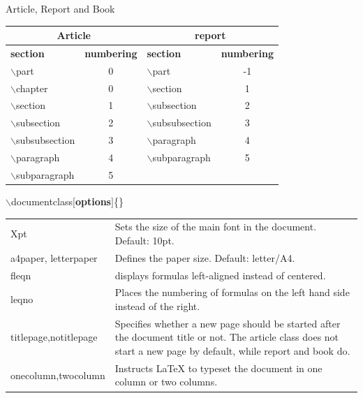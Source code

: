 \documentclass[10pt,times]{beamer}
\begin{document}
\begin{frame}{Article, Report and Book}
\begin{table}
\begin{tabular}{|l|c|l|c|}
\hline
\multicolumn{2}{c}{\textbf{Article}}  & \multicolumn{2}{c}{\textbf{report}} \\ 
\hline
\textbf{section} &\textbf{ numbering} & \textbf{section} & \textbf{numbering} \\ \hline
$\backslash$part & 0 & $\backslash$part & -1 \\ \hline
$\backslash$chapter & 0 & $\backslash$section & 1 \\ \hline
$\backslash$section & 1 & $\backslash$subsection & 2 \\ \hline
$\backslash$subsection & 2 & $\backslash$subsubsection & 3 \\ \hline
$\backslash$subsubsection & 3 & $\backslash$paragraph & 4 \\ \hline
$\backslash$paragraph & 4 & $\backslash$subparagraph & 5 \\ \hline
$\backslash$subparagraph & 5 & & \\ \hline

\end{tabular}
\end{table}
\end{frame}

\begin{frame}{$\backslash$documentclass$[$\textbf{options}$]$\{\}}
\begin{table}
\begin{tabular}{|p{}|p{}|}
\hline
Xpt & Sets the size of the main font in the document. Default: 10pt. \\
a4paper, \newline letterpaper & Defines the paper size. Default: letter/A4. \\
fleqn & displays formulas left-aligned instead of centered. \\
leqno & Places the numbering of formulas on the left hand side instead of the right. \\
titlepage,\newline  notitlepage & Specifies whether a new page should be started after the document title or not. The article class does not start a new page by default, while report and book do.\\
onecolumn,\newline  twocolumn & Instructs LaTeX to typeset the document in one column or two columns. \\
\end{tabular}
\end{table}
\end{frame}
\end{document}
